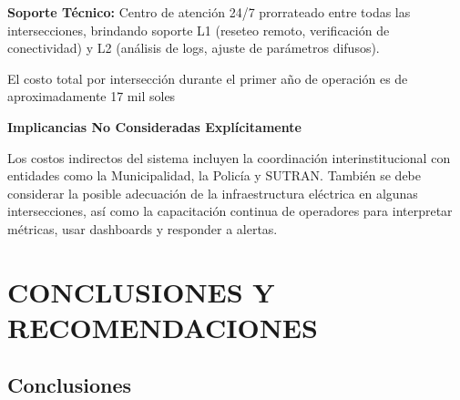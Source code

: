 \documentclass[12pt,a4paper,oneside]{report}
\begin{document}
\textbf{Soporte Técnico:} Centro de atención 24/7 prorrateado entre todas las intersecciones, brindando soporte L1 (reseteo remoto, verificación de conectividad) y L2 (análisis de logs, ajuste de parámetros difusos).

El costo total por intersección durante el primer año de operación es de aproximadamente 17 mil soles

\textbf{Implicancias No Consideradas Explícitamente}

Los costos indirectos del sistema incluyen la coordinación interinstitucional con entidades como la Municipalidad, la Policía y SUTRAN. También se debe considerar la posible adecuación de la infraestructura eléctrica en algunas intersecciones, así como la capacitación continua de operadores para interpretar métricas, usar dashboards y responder a alertas.

\chapter*{CONCLUSIONES Y RECOMENDACIONES}\label{conclusiones-y-observaciones}

\section*{Conclusiones}
\end{document}
